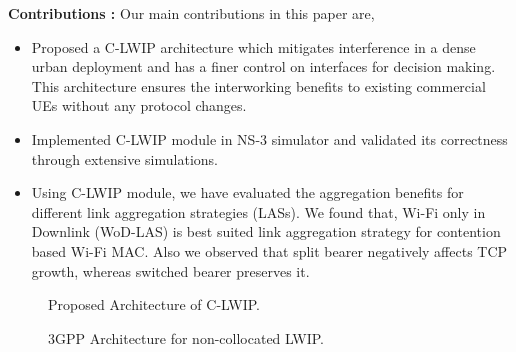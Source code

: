 \documentclass[conference]{IEEEtran}
\begin{document}
\textbf{Contributions : }Our main contributions in this paper are,
\begin{itemize}
\item Proposed a C-LWIP architecture which mitigates interference in a dense urban deployment and has a finer control on interfaces for decision making. This architecture ensures the interworking benefits to existing commercial UEs without any protocol changes.
\item Implemented C-LWIP module in NS-3 simulator and validated it\textquotesingle s correctness through extensive simulations.
\item Using C-LWIP module, we have evaluated the aggregation benefits for different link aggregation strategies (LASs). We found that, Wi-Fi only in Downlink (WoD-LAS) is best suited link aggregation strategy for contention based Wi-Fi MAC. Also we observed that split bearer negatively affects TCP growth, whereas switched bearer preserves it.
\end{itemize}

\begin{figure}[b]
\centering
{}
\caption{Proposed Architecture of C-LWIP.}
\label{fig:proposed}
\end{figure}

\begin{figure}[t]
\centering
\caption{3GPP Architecture for non-collocated LWIP.}
\vspace{-0.8 cm}
 \label{fig:3gpp_lwip}
\end{figure}
\end{document}
